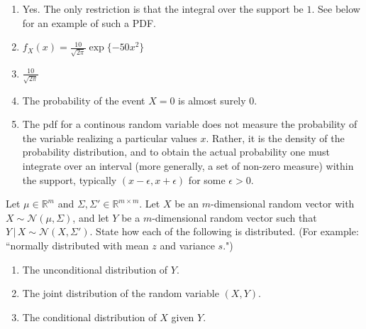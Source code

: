 \documentclass{harvardml}
\newcommand{\given}{\,|\,}
\newcommand{\R}{\mathbb{R}}
\begin{document}
\begin{enumerate}[label=(\alph*)]
\item Yes. The only restriction is that the integral over the support be $1$. See below for an example of such a PDF.
\item $f_X(x) = \frac{10}{\sqrt{2\pi}}\exp\{-50x^2\}$
\item $\frac{10}{\sqrt{2\pi}}$
\item The probability of the event $X = 0$ is almost surely $0$.
\item The pdf for a continous random variable does not measure the probability of the variable realizing a particular values $x$. Rather, it is the density of the probability distribution, and to obtain the actual probability one must integrate over an interval (more generally, a set of non-zero measure) within the support, typically $(x - \epsilon, x + \epsilon)$ for some $\epsilon > 0$.
\end{enumerate}


\begin{problem}
Let $\mu \in \R^m$ and $\Sigma, \Sigma' \in \R^{m \times m}$. Let $X$ be an $m$-dimensional random vector with $X \sim \mathcal{N}(\mu, \Sigma)$, and let $Y$ be a $m$-dimensional random vector such that $Y \given X \sim \mathcal{N}(X, \Sigma')$. State how each of the following is distributed. (For example: ``normally distributed with mean $z$ and variance $s$.")
\begin{enumerate}[label=(\alph*)]
  \item The unconditional distribution of $Y$.
  \item The joint distribution of the random variable $(X,Y)$.
  \item The conditional distribution of $X$ given $Y$.
\end{enumerate}
\end{problem}
\end{document}
